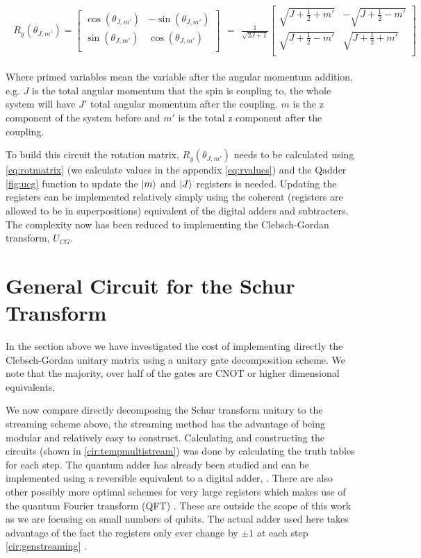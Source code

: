 \documentclass[12pt]{article}
\begin{document}
\begin{align}
\begin{split}
R_y(\theta_{J,m'})=
\begin{bmatrix}
\cos(\theta_{J,m'}) &-\sin(\theta_{J,m'}) \\
\sin(\theta_{J,m'}) & \cos(\theta_{J,m'}) \\
\end{bmatrix}
\end{split}
=
\begin{split}
\frac{1}{\sqrt{2J+1}}
\begin{bmatrix}
\sqrt{J+\frac{1}{2}+m'} &-\sqrt{J+\frac{1}{2}-m'} \\
\sqrt{J+\frac{1}{2}-m'} & \sqrt{J+\frac{1}{2}+m'} \\
\end{bmatrix}
\end{split}
\label{eq:rotmatrix}
\end{align}

Where primed variables mean the variable after the angular momentum addition, e.g. $J$ is the total angular momentum that the spin is coupling to, the whole system will have $J'$ total angular momentum after the coupling. $m$ is the z component of the system before and $m'$ is the total z component after the coupling.

To build this circuit the rotation matrix, $R_y(\theta_{J,m'})$ needs to be calculated using \autoref{eq:rotmatrix} (we calculate values in the appendix \autoref{eq:rvalues}) and the Qadder \autoref{fig:ucg} function to update the $\left\vert{m}\right\rangle$ and $\left\vert{J}\right\rangle$ registers is needed. Updating the registers can be implemented relatively simply using the coherent (registers are allowed to be in superpositions) equivalent of the digital adders and subtracters. The complexity now has been reduced to implementing the Clebsch-Gordan transform, $U_{CG}$.

\section{General Circuit for the Schur Transform}

In the section above we have investigated the cost of implementing directly the Clebsch-Gordan unitary matrix using a unitary gate decomposition scheme. We note that the majority, over half of the gates are CNOT or higher dimensional equivalents.

We now compare directly decomposing the Schur transform unitary to the streaming scheme above, the streaming method has the advantage of being modular and relatively easy to construct. Calculating and constructing the circuits (shown in \autoref{cir:tempmultistream}) was done by calculating the truth tables for each step. The quantum adder has already been studied and can be implemented using a reversible equivalent to a digital adder, \cite{draper2004logarithmic}. There are also other possibly more optimal schemes for very large registers which makes use of the quantum Fourier transform (QFT) \cite{draper2000addition}. These are outside the scope of this work as we are focusing on small numbers of qubits. The actual adder used here takes advantage of the fact the registers only ever change by $\pm1$ at each step \autoref{cir:genstreaming} . 
\end{document}
